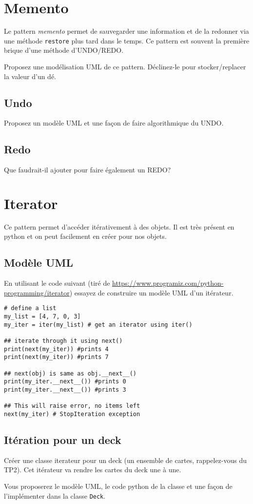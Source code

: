 \documentclass[12pt]{article}
\begin{document}
\section{Memento}

Le pattern {\em memento} permet de sauvegarder une information et de la redonner via une méthode \verb|restore| plus tard dans le temps. Ce pattern est souvent la première brique d'une méthode d'UNDO/REDO.


Proposez une modélisation UML de ce pattern. Déclinez-le pour stocker/replacer la valeur d'un dé.

\subsection{Undo}
Proposez un modèle UML et une façon de faire algorithmique du UNDO. 

\subsection{Redo}

Que faudrait-il ajouter pour faire également un REDO?


\section{Iterator}

Ce pattern permet d'accéder itérativement à des objets. Il est très présent en python et on peut facilement en créer pour nos objets.

\subsection{Modèle UML}

En utilisant le code suivant (tiré de \url{https://www.programiz.com/python-programming/iterator}) essayez de construire un modèle UML d'un itérateur.

\lstset{language=Python}
\begin{lstlisting}
# define a list
my_list = [4, 7, 0, 3]
my_iter = iter(my_list) # get an iterator using iter()

## iterate through it using next() 
print(next(my_iter)) #prints 4
print(next(my_iter)) #prints 7

## next(obj) is same as obj.__next__()
print(my_iter.__next__()) #prints 0
print(my_iter.__next__()) #prints 3

## This will raise error, no items left
next(my_iter) # StopIteration exception
\end{lstlisting}

\subsection{Itération pour un deck}

Créer une classe iterateur pour un deck (un ensemble de cartes, rappelez-vous du TP2). Cet itérateur va rendre les cartes du deck une à une.

Vous proposerez le modèle UML, le code python de la classe et une façon de l'implémenter dans la classe \verb|Deck|.
\end{document}
